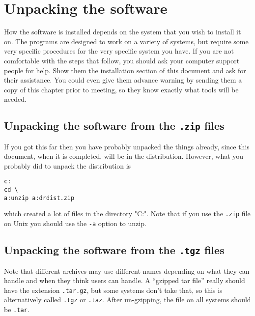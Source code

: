 \documentclass[%
	11pt,
        a4paper,
        twoside]{workrep}
\newcommand*{\prg}[1]{\textsf{#1}}		%
\newcommand*{\file}[1]{\texttt{#1}}		%
\newcommand*{\opt}[1]{\texttt{#1}}		%
\begin{document}

\section{Unpacking the software}

How the software is installed depends on the system that you wish to
install it on.  The programs are designed to work on a variety of
systems, but require some very specific procedures for the very
specific system you have.  If you are not comfortable with the steps
that follow, you should ask your computer support people for help.
Show them the installation section of this document and ask for their
assistance.   You could even give them advance warning by sending
them a copy of this chapter prior to meeting, so they know exactly
what tools will be needed.

\subsection
   {Unpacking the software from the \file{.zip} files}\label{sec:zip}

If you got this far then you have probably unpacked the things
already, since this document, when it is completed, will be in the
distribution.  However, what you probably did to unpack the
distribution is

\begin{verbatim}
c:
cd \
a:unzip a:drdist.zip
\end{verbatim}
which created a lot of files in the directory "C:\distrat".  Note
that if you use the \file{.zip} file on Unix you should use the \opt{-a}
option to \prg{unzip}.

\subsection
   {Unpacking the software from the \file{.tgz} files}\label{sec:tar.gz}

Note that different archives may use different names depending
on what they can handle and when they think users can handle.  A
``gzipped tar file'' really should have the extension \file{.tar.gz},
but some systems don't take that, so this is alternatively called
\file{.tgz} or \file{.taz}.  After un-gzipping, the file on all
systems should be \file{.tar}.
\end{document}
